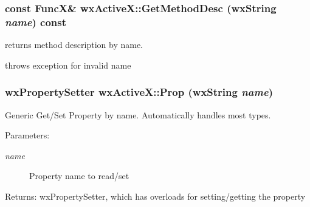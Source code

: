\subsubsection{\setlength{\rightskip}{0pt plus 5cm}const {\bf Func\-X}\& wx\-Active\-X::Get\-Method\-Desc (wx\-String {\em name}) const}\label{classwxActiveX_a10}


returns method description by name.

throws exception for invalid name 
\subsubsection{\setlength{\rightskip}{0pt plus 5cm}wx\-Property\-Setter wx\-Active\-X::Prop (wx\-String {\em name})\hspace{0.3cm}{\tt  [inline]}}\label{classwxActiveX_a13}


Generic Get/Set Property by name. Automatically handles most types.

\begin{Desc}
\item[Parameters:]
\begin{description}
\item[{\em name}]Property name to read/set \end{description}
\end{Desc}
\begin{Desc}
\item[Returns:]wx\-Property\-Setter, which has overloads for setting/getting the property \end{Desc}


